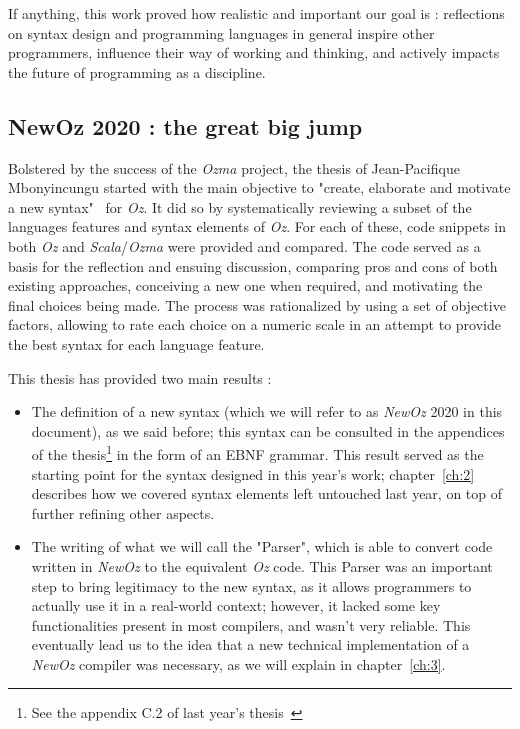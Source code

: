 If anything, this work proved how realistic and important our goal is : reflections on syntax design and programming languages in general inspire other programmers, influence their way of working and thinking, and actively impacts the future of programming as a discipline.

\subsection{NewOz 2020 : the great big jump}\label{subsec:ch1-newoz2020}
Bolstered by the success of the \textit{Ozma} project, the thesis of Jean-Pacifique Mbonyincungu started with the main objective to "create, elaborate and motivate a new syntax"~\cite{jpthesis} for \textit{Oz}.
It did so by systematically reviewing a subset of the languages features and syntax elements of \textit{Oz}.
For each of these, code snippets in both \textit{Oz} and \textit{Scala}/\textit{Ozma} were provided and compared.
The code served as a basis for the reflection and ensuing discussion, comparing pros and cons of both existing approaches, conceiving a new one when required, and motivating the final choices being made.
The process was rationalized by using a set of objective factors, allowing to rate each choice on a numeric scale in an attempt to provide the best syntax for each language feature.\newline

This thesis has provided two main results :
\begin{itemize}
    \item The definition of a new syntax (which we will refer to as \textit{NewOz} 2020 in this document), as we said before;
    this syntax can be consulted in the appendices of the thesis\footnote{See the appendix C.2 of last year's thesis~\cite{jpthesis}} in the form of an EBNF grammar.
    This result served as the starting point for the syntax designed in this year's work;
    chapter~\ref{ch:2} describes how we covered syntax elements left untouched last year, on top of further refining other aspects.
    \item The writing of what we will call the "Parser", which is able to convert code written in \textit{NewOz} to the equivalent \textit{Oz} code.
    This Parser was an important step to bring legitimacy to the new syntax, as it allows programmers to actually use it in a real-world context;
    however, it lacked some key functionalities present in most compilers, and wasn't very reliable.
    This eventually lead us to the idea that a new technical implementation of a \textit{NewOz} compiler was necessary, as we will explain in chapter~\ref{ch:3}.
\end{itemize}

